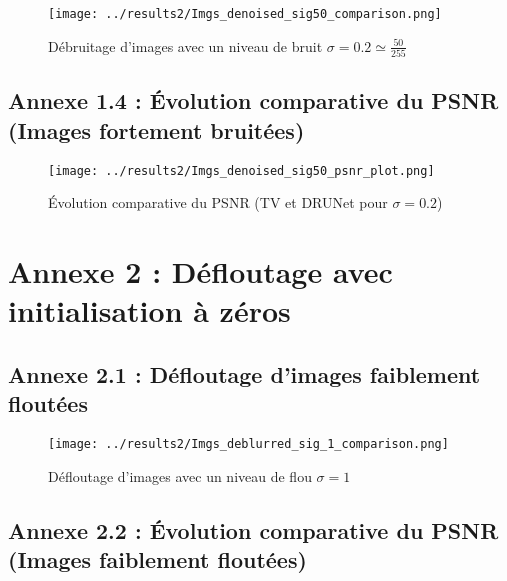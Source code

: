 \documentclass[a4paper, 12pt]{report} %
\begin{document}
\begin{figure}[H]
\centering
\begin{adjustbox}{width=1\linewidth, totalheight=0.5 \textheight, angle=0, scale= 0.72, minipage= 4.2\linewidth, margin= 0}
\texttt{[image: ../results2/Imgs\_denoised\_sig50\_comparison.png]}
\end{adjustbox}
\caption{Débruitage d'images avec un niveau de bruit $\sigma = 0.2 \simeq \frac{50}{255}$} 
    \label{fig:22}
\end{figure}  

\subsection*{Annexe 1.4 : Évolution comparative du PSNR (Images fortement bruitées)}

\begin{figure}[H]
\centering
\begin{adjustbox}{width=1\linewidth, totalheight=0.5 \textheight, angle=0, scale= 0.72, minipage= 4.2\linewidth, margin= 0}
\texttt{[image: ../results2/Imgs\_denoised\_sig50\_psnr\_plot.png]}
\end{adjustbox}
\caption{Évolution comparative du PSNR (TV et DRUNet pour $\sigma = 0.2$)} 
    \label{fig:23}
\end{figure}

\section*{Annexe 2 : Défloutage avec initialisation à zéros}
\subsection*{Annexe 2.1 : Défloutage d'images faiblement floutées}
\begin{figure}[H]
\centering
\begin{adjustbox}{width=1\linewidth, totalheight=0.5 \textheight, angle=0, scale= 0.72, minipage= 4.2\linewidth, margin= 0}
    \texttt{[image: ../results2/Imgs\_deblurred\_sig\_1\_comparison.png]}
\end{adjustbox}
    \caption{ Défloutage d'images avec un niveau de flou $\sigma = 1$}
    \label{fig:24}
\end{figure} 

\subsection*{Annexe 2.2 : Évolution comparative du PSNR (Images faiblement floutées)}
\end{document}
